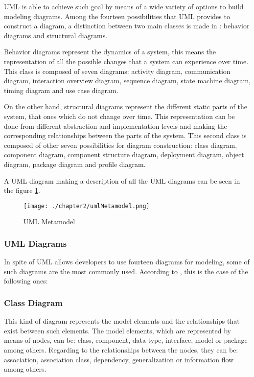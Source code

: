 UML is able to achieve such goal by means of a wide variety of options to build modeling diagrams. Among the fourteen possibilities that UML provides to construct a diagram, a distinction between two main classes is made in \cite{umlwebsite}: behavior diagrams and structural diagrams.

Behavior diagrams represent the dynamics of a system, this means the representation of all the possible changes that a system can experience over time. This class is composed of seven diagrams: activity diagram, communication diagram, interaction overview diagram, sequence diagram, state machine diagram, timing diagram and use case diagram.

On the other hand, structural diagrams represent the different static parts of the system, that ones which do not change over time. This representation can be done from different abstraction and implementation levels and making the corresponding relationships between the parts of the system. This second class is composed of other seven possibilities for diagram construction: class diagram, component diagram, component structure diagram, deployment diagram, object diagram, package diagram and profile diagram.

A UML diagram making a description of all the UML diagrams can be seen in the figure \ref{fig:UML Metamodel}.

\begin{figure}
\centering
{\texttt{[image: ./chapter2/umlMetamodel.png]}}
\caption{UML Metamodel}
\label{fig:UML Metamodel}
\end{figure}

\subsubsection{UML Diagrams}

In spite of UML allows developers to use fourteen diagrams for modeling, some of such diagrams are the most commonly used. According to \cite{umlwebsite}, this is the case of the following ones:

\subsubsection*{Class Diagram}

This kind of diagram represents the model elements and the relationships that exist between such elements. The model elements, which are represented by means of nodes, can be: class, component, data type, interface, model or package among others. Regarding to the relationships between the nodes, they can be: association, association class, dependency, generalization or information flow among others.

